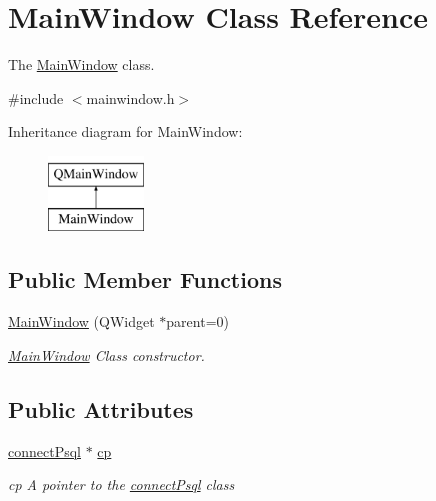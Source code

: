 \hypertarget{class_main_window}{}\section{Main\+Window Class Reference}
\label{class_main_window}


The \hyperlink{class_main_window}{Main\+Window} class.  




{\ttfamily \#include $<$mainwindow.\+h$>$}

Inheritance diagram for Main\+Window\+:\begin{figure}[H]
\begin{center}
\leavevmode
\includegraphics[height=2.000000cm]{class_main_window}
\end{center}
\end{figure}
\subsection*{Public Member Functions}
\begin{DoxyCompactItemize}
\item 
\hyperlink{class_main_window_a8b244be8b7b7db1b08de2a2acb9409db}{Main\+Window} (Q\+Widget $\ast$parent=0)
\begin{DoxyCompactList}\small\item\em \hyperlink{class_main_window}{Main\+Window} Class constructor. \end{DoxyCompactList}\end{DoxyCompactItemize}
\subsection*{Public Attributes}
\begin{DoxyCompactItemize}
\item 
\mbox{\label{class_main_window_af6a0a464b2432a13ece4953de0e66441}} 
\hyperlink{classconnect_psql}{connect\+Psql} $\ast$ \hyperlink{class_main_window_af6a0a464b2432a13ece4953de0e66441}{cp}
\begin{DoxyCompactList}\small\item\em cp A pointer to the \hyperlink{classconnect_psql}{connect\+Psql} class \end{DoxyCompactList}\end{DoxyCompactItemize}



